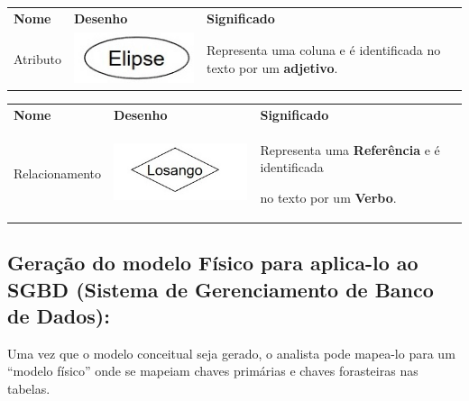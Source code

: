 \documentclass[
]{book}
\begin{document}
\begin{longtable}[]{@{}
  >{\centering\arraybackslash}p{}
  >{\centering\arraybackslash}p{}
  >{\centering\arraybackslash}p{}@{}}
\toprule\noalign{}
\endhead
\bottomrule\noalign{}
\endlastfoot
\textbf{Nome} & \textbf{Desenho} & \textbf{Significado} \\
Atributo & \includegraphics[width=1.89583in,height=\textheight]{images/5-bi/05-elipse.jpg} & Representa uma coluna e é identificada no texto por um \textbf{adjetivo}. \\
\end{longtable}

\begin{longtable}[]{@{}
  >{\centering\arraybackslash}p{}
  >{\centering\arraybackslash}p{}
  >{\centering\arraybackslash}p{}@{}}
\toprule\noalign{}
\endhead
\bottomrule\noalign{}
\endlastfoot
\textbf{Nome} & \textbf{Desenho} & \textbf{Significado} \\
Relacionamento & \includegraphics[width=1.92708in,height=\textheight]{images/5-bi/04-losango.jpg} & Representa uma \textbf{Referência} e é identificada

no texto por um \textbf{Verbo}. \\
\end{longtable}

\subsection{Geração do modelo Físico para aplica-lo ao SGBD (Sistema de Gerenciamento de Banco de Dados):}\label{gerauxe7uxe3o-do-modelo-fuxedsico-para-aplica-lo-ao-sgbd-sistema-de-gerenciamento-de-banco-de-dados}

Uma vez que o modelo conceitual seja gerado, o analista pode mapea-lo para um ``modelo físico'' onde se mapeiam chaves primárias e chaves forasteiras nas tabelas.
\end{document}
